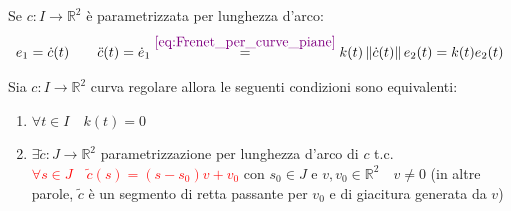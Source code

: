 \begin{esempio}
\begin{center}
        \end{center}
        \end{esempio}
        \begin{osservazione}
        Se $c \colon I \to \mathbb{R}^2$ è parametrizzata per lunghezza d'arco: 
        \begin{equation}
        \label{eq:riferimento_di_Frenet_curve_piane_parametrizzate_per_lunghezza_d_arco}
        e_1 = \dot{c}(t) \qquad \ddot{c}(t)= \dot{e}_1 \overset{\textcolor{violet}{\eqref{eq:Frenet_per_curve_piane}}}{=}k(t) \, \lVert\dot{c}(t)\rVert \, e_2(t) = k(t) e_2(t)
        \end{equation}
        \end{osservazione}
        \newpage
        \begin{proposizione}
        Sia $c \colon I \to \mathbb{R}^2$ curva regolare allora le seguenti condizioni sono equivalenti:
        \begin{enumerate}
            \item $\forall t \in I \quad k(t)=0$
            \item $\exists \tilde{c} \colon J \to \mathbb{R}^2$ parametrizzazione per lunghezza d'arco di $c$ t.c. \textcolor{red}{$\forall s \in J \quad \tilde{c}(s)=\left(s-s_0\right)v +v_0$} con $s_0 \in J$ 
            e $v, v_0 \in \mathbb{R}^2 \quad v \neq 0$ \textcolor{blu}{(in altre parole, $\tilde{c}$ è un segmento di retta passante per $v_0$ e di giacitura generata da $v$)}
        \end{enumerate}
        \end{proposizione}
